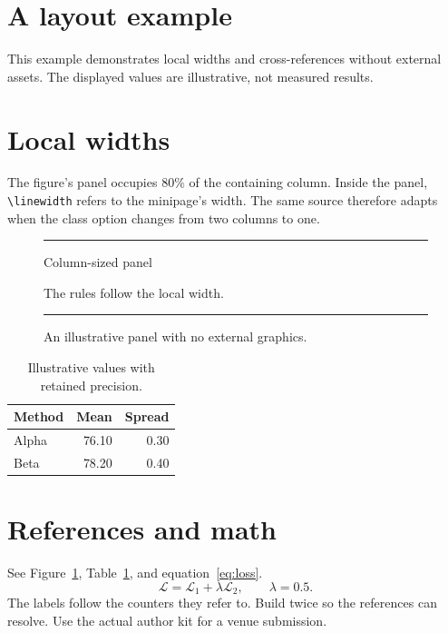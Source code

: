 \documentclass[twocolumn]{article}
\begin{document}
\section*{A layout example}
This example demonstrates local widths and cross-references without external
assets. The displayed values are illustrative, not measured results.

\section{Local widths}
The figure's panel occupies 80\% of the containing column. Inside the panel,
\verb|\linewidth| refers to the minipage's width. The same source therefore
adapts when the class option changes from two columns to one.

\begin{figure}[htbp]
  \centering
  \begin{minipage}{0.8\textwidth}
    \noindent\rule{\textwidth}{0.4pt}\par
    \smallskip
    \centering
    Column-sized panel\par
    The rules follow the local width.
    \par\smallskip
    \noindent\rule{\textwidth}{0.4pt}
  \end{minipage}
  \caption{An illustrative panel with no external graphics.}
  \label{fig:panel}
\end{figure}

\begin{table}[htbp]
  \centering
  \caption{Illustrative values with retained precision.}
  \label{tab:illustration}
  \begin{tabular*}{\linewidth}{@{\extracolsep{\fill}}lrr@{}}
    \toprule
    Method & Mean & Spread \\
    \midrule
    Alpha & 76.10 & 0.30 \\
    Beta & 78.20 & 0.40 \\
    \bottomrule
  \end{tabular*}
\end{table}

\section{References and math}
See Figure~\ref{fig:panel}, Table~\ref{tab:illustration}, and
equation~\eqref{eq:loss}.
\begin{equation}
  \mathcal{L}=\mathcal{L}_1+\lambda\mathcal{L}_2,
  \qquad \lambda=0.5.
  \label{eq:loss}
\end{equation}
The labels follow the counters they refer to. Build twice so the references
can resolve. Use the actual author kit for a venue submission.
\end{document}
